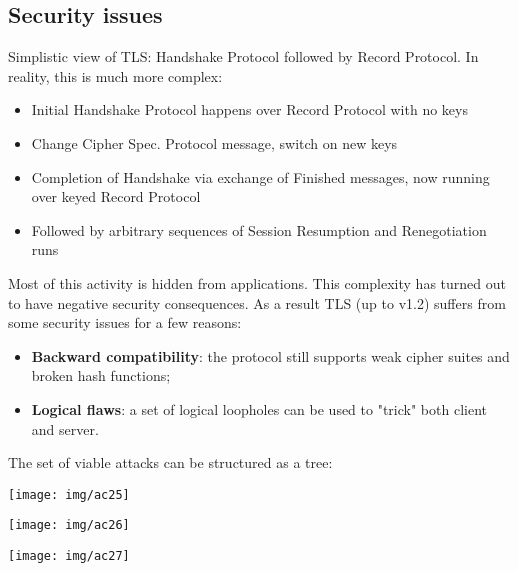 \documentclass[a4paper, 10pt, titlepage]{article}
\begin{document}
\subsection{Security issues}
Simplistic view of TLS: Handshake Protocol followed by Record Protocol. In reality, this is much more complex:
\begin{itemize}
\item Initial Handshake Protocol happens over Record Protocol with no keys
\item Change Cipher Spec. Protocol message, switch on new keys
\item Completion of Handshake via exchange of Finished messages, now running over keyed Record Protocol
\item Followed by arbitrary sequences of Session Resumption and Renegotiation runs
\end{itemize}
Most of this activity is hidden from applications. This complexity has turned out to have negative security consequences. As a result TLS (up to v1.2) suffers from some security issues for a few reasons:
\begin{itemize}
\item \textbf{Backward compatibility}: the protocol still supports weak cipher suites and broken hash functions;
\item \textbf{Logical flaws}: a set of logical loopholes can be used to "trick" both client and server.
\end{itemize}
The set of viable attacks can be structured as a tree:
\begin{center}
\texttt{[image: img/ac25]}
\end{center}
\begin{minipage}{0.7\textwidth}
\texttt{[image: img/ac26]}
\end{minipage}
\begin{minipage}{0.25\textwidth}
\texttt{[image: img/ac27]}
\end{minipage}
\end{document}
